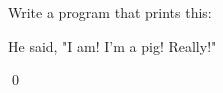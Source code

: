Write a program that prints this:
\begin{console}
He said, "I am! I'm a pig! Really!"
\end{console}
\qed
